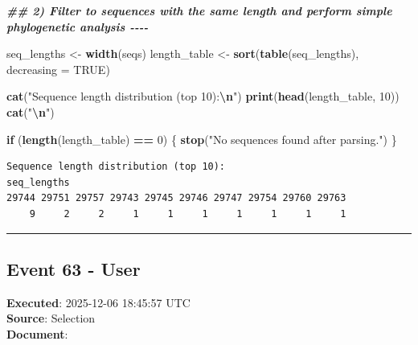 \documentclass[
  11pt,
]{article}
\newenvironment{Shaded}{\begin{snugshade}}{\end{snugshade}}
\newcommand{\AttributeTok}[1]{\textcolor[rgb]{0.13,0.29,0.53}{#1}}
\newcommand{\ConstantTok}[1]{\textcolor[rgb]{0.56,0.35,0.01}{#1}}
\newcommand{\ControlFlowTok}[1]{\textcolor[rgb]{0.13,0.29,0.53}{\textbf{#1}}}
\newcommand{\DecValTok}[1]{\textcolor[rgb]{0.00,0.00,0.81}{#1}}
\newcommand{\DocumentationTok}[1]{\textcolor[rgb]{0.56,0.35,0.01}{\textbf{\textit{#1}}}}
\newcommand{\FunctionTok}[1]{\textcolor[rgb]{0.13,0.29,0.53}{\textbf{#1}}}
\newcommand{\NormalTok}[1]{#1}
\newcommand{\OtherTok}[1]{\textcolor[rgb]{0.56,0.35,0.01}{#1}}
\newcommand{\SpecialCharTok}[1]{\textcolor[rgb]{0.81,0.36,0.00}{\textbf{#1}}}
\newcommand{\StringTok}[1]{\textcolor[rgb]{0.31,0.60,0.02}{#1}}
\newenvironment{rpoutput}{\vspace{0.5em}\begin{snugshade}}{\end{snugshade}}
\begin{document}
\begin{Shaded}
\begin{Highlighting}[]
\DocumentationTok{\#\# 2) Filter to sequences with the same length and perform simple phylogenetic analysis {-}{-}{-}{-}}

\NormalTok{seq\_lengths }\OtherTok{\textless{}{-}} \FunctionTok{width}\NormalTok{(seqs)}
\NormalTok{length\_table }\OtherTok{\textless{}{-}} \FunctionTok{sort}\NormalTok{(}\FunctionTok{table}\NormalTok{(seq\_lengths), }\AttributeTok{decreasing =} \ConstantTok{TRUE}\NormalTok{)}

\FunctionTok{cat}\NormalTok{(}\StringTok{"Sequence length distribution (top 10):}\SpecialCharTok{\textbackslash{}n}\StringTok{"}\NormalTok{)}
\FunctionTok{print}\NormalTok{(}\FunctionTok{head}\NormalTok{(length\_table, }\DecValTok{10}\NormalTok{))}
\FunctionTok{cat}\NormalTok{(}\StringTok{"}\SpecialCharTok{\textbackslash{}n}\StringTok{"}\NormalTok{)}

\ControlFlowTok{if}\NormalTok{ (}\FunctionTok{length}\NormalTok{(length\_table) }\SpecialCharTok{==} \DecValTok{0}\NormalTok{) \{}
  \FunctionTok{stop}\NormalTok{(}\StringTok{"No sequences found after parsing."}\NormalTok{)}
\NormalTok{\}}
\end{Highlighting}
\end{Shaded}

\begin{rpoutput}

\begin{verbatim}
Sequence length distribution (top 10):
seq_lengths
29744 29751 29757 29743 29745 29746 29747 29754 29760 29763 
    9     2     2     1     1     1     1     1     1     1 
\end{verbatim}

\end{rpoutput}

\begin{center}\rule{0.5\linewidth}{0.5pt}\end{center}

\subsection{Event 63 - User}\label{event-63---user}

\textbf{Executed}: 2025-12-06 18:45:57 UTC\\
\textbf{Source}: Selection\\
\textbf{Document}:
\end{document}
